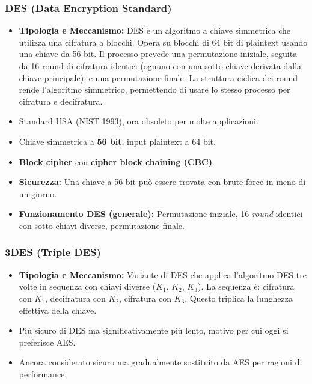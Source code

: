 \subsubsection{DES (Data Encryption Standard)}
\begin{itemize}
    \item \textbf{Tipologia e Meccanismo:} DES è un algoritmo a chiave simmetrica che utilizza una cifratura a blocchi. Opera su blocchi di 64 bit di plaintext usando una chiave da 56 bit. Il processo prevede una permutazione iniziale, seguita da 16 round di cifratura identici (ognuno con una sotto-chiave derivata dalla chiave principale), e una permutazione finale. La struttura ciclica dei round rende l'algoritmo simmetrico, permettendo di usare lo stesso processo per cifratura e decifratura.
    \item Standard USA (NIST 1993), ora obsoleto per molte applicazioni.
    \item Chiave simmetrica a \textbf{56 bit}, input plaintext a 64 bit.
    \item \textbf{Block cipher} con \textbf{cipher block chaining (CBC)}.
    \item \textbf{Sicurezza:} Una chiave a 56 bit può essere trovata con brute force in meno di un giorno.
    \item \textbf{Funzionamento DES (generale):} Permutazione iniziale, 16 \textit{round} identici con sotto-chiavi diverse, permutazione finale.
\end{itemize}

\subsubsection{3DES (Triple DES)}
\begin{itemize}
    \item \textbf{Tipologia e Meccanismo:} Variante di DES che applica l'algoritmo DES tre volte in sequenza con chiavi diverse ($K_1$, $K_2$, $K_3$). La sequenza è: cifratura con $K_1$, decifratura con $K_2$, cifratura con $K_3$. Questo triplica la lunghezza effettiva della chiave.
    \item Più sicuro di DES ma significativamente più lento, motivo per cui oggi si preferisce AES.
    \item Ancora considerato sicuro ma gradualmente sostituito da AES per ragioni di performance.
\end{itemize}

